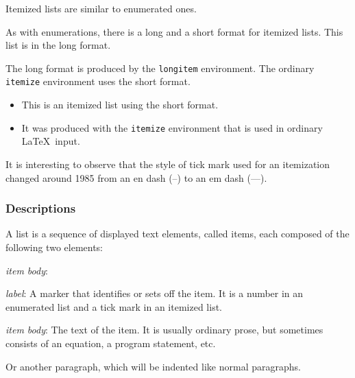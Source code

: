 \documentclass[hyperref]{acmtrans2e}
\begin{document}
Itemized lists are similar to enumerated ones.
\begin{longitem}
\item As with enumerations, there is a long and a short
format for itemized lists.  This list is in the long format.

\item The long format is produced by the {\tt longitem}
environment.  The ordinary {\tt itemize} environment
uses the short format.
\begin{itemize}
\item This is an itemized list using the short format.

\item It was produced  with the {\tt itemize} environment
that is used in ordinary \LaTeX\ input.
\end{itemize}
\end{longitem}

It is interesting to observe that the style of tick mark used
for an itemization changed around 1985 from an en dash
(--) to an em dash (---). %

\subsubsection{Descriptions}

A list is a sequence of displayed text elements, called items, each
composed of the following two elements:
\begin{describe}{{\em item body\/}:}
\item[{\em label\/}:]
A marker that identifies or sets off the item.  It
is a number in an enumerated list and a tick mark in an itemized list.

\item[{\em item body\/}:] The text of the item.  It is usually ordinary prose,
but sometimes consists of an equation, a program statement, etc.

Or another paragraph, which will be indented like normal paragraphs.
\end{describe}
\end{document}
